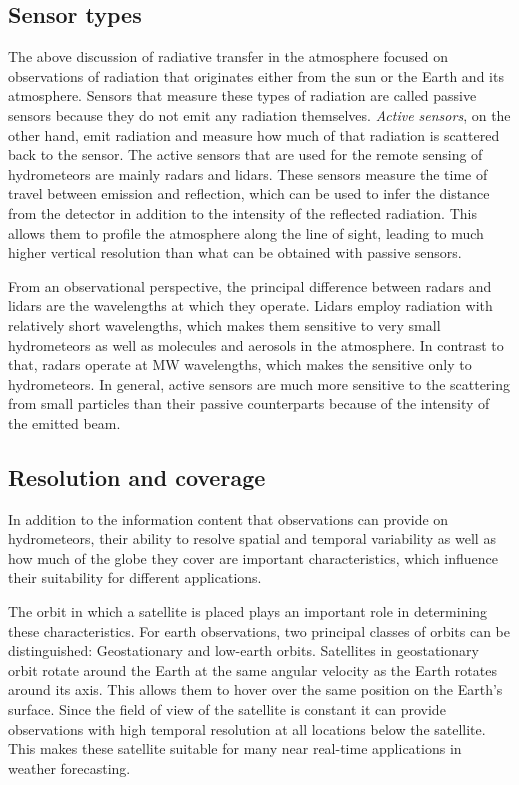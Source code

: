 \subsection{Sensor types}

The above discussion of radiative transfer in the atmosphere focused on
observations of radiation that originates either from the sun or the Earth and
its atmosphere. Sensors that measure these types of radiation are called passive
sensors because they do not emit any radiation themselves. \textit{Active
sensors}, on the other hand, emit radiation and measure how much of that
radiation is scattered back to the sensor. The active sensors that are used for
the remote sensing of hydrometeors are mainly radars and lidars. These sensors
measure the time of travel between emission and reflection, which can be used to
infer the distance from the detector in addition to the intensity of the
reflected radiation. This allows them to profile the atmosphere along the line
of sight, leading to much higher vertical resolution than what can be obtained
with passive sensors.

From an observational perspective, the principal difference between radars and
lidars are the wavelengths at which they operate. Lidars employ radiation with
relatively short wavelengths, which makes them sensitive to very small
hydrometeors as well as molecules and aerosols in the atmosphere. In contrast to
that, radars operate at MW wavelengths, which makes the sensitive only to
hydrometeors. In general, active sensors are much more sensitive to the
scattering from small particles than their passive counterparts because of the
intensity of the emitted beam.

\subsection{Resolution and coverage}

In addition to the information content that observations can provide on
hydrometeors, their ability to resolve spatial and temporal variability as well
as how much of the globe they cover are important characteristics, which
influence their suitability for different applications.

The orbit in which a satellite is placed plays an important role in determining
these characteristics. For earth observations, two principal classes of orbits
can be distinguished: Geostationary and low-earth orbits. Satellites in
geostationary orbit rotate around the Earth at the same angular velocity as the
Earth rotates around its axis. This allows them to hover over the same position
on the Earth's surface. Since the field of view of the satellite is constant it
can provide observations with high temporal resolution at all locations below
the satellite. This makes these satellite suitable for many near real-time
applications in weather forecasting.

